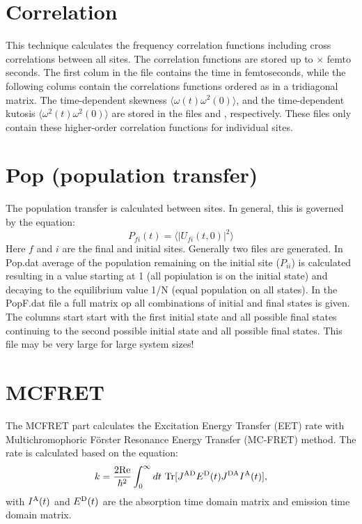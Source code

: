 \section{Correlation}
This technique calculates the frequency correlation functions including cross correlations between all sites. The correlation functions are stored up to $\times$ femto seconds. The first colum in the file  contains the time in femtoseconds, while the following colums contain the correlations functions ordered as in a tridiagonal matrix. The time-dependent skewness $\langle \omega(t)\omega^2(0) \rangle$, and the time-dependent kutosis $\langle \omega^2(t)\omega^2(0) \rangle$ are stored in the files  and , respectively. These files only contain these higher-order correlation functions for individual sites.
\section{Pop (population transfer)}
The population transfer is calculated between sites. In general, this is governed by the equation:
\begin{equation}
P_{fi}(t)=\langle |U_{fi}(t,0)|^2 \rangle
\end{equation}
Here $f$ and $i$ are the final and initial sites. Generally two files are generated. In Pop.dat average of the population remaining on the initial site ($P_{ii}$) is calculated resulting in a value starting at 1 (all popiulation is on the initial state) and decaying to the equilibrium value 1/N (equal population on all states). In the PopF.dat file a full matrix op all combinations of initial and final states is given. The columns start start with the first initial state and all possible final states continuing to the second possible initial state and all possible final states. This file may be very large for large system sizes!

\section{MCFRET}
The MCFRET part calculates the Excitation Energy Transfer (EET) rate with Multichromophoric Förster Resonance Energy Transfer (MC-FRET) method.\cite{Jang.2004.Phys.Rev.Lett..92.218301,Jang.2007.J.Phys.Chem.B..111.6807,Zhong.2023.J.Chem.Phys..158.064103} The rate is calculated based on the equation:
\begin{equation}\label{eq:17} 
    k=\frac{\rm 2Re}{\hbar^2}\int_{0}^{\infty}dt\ \textrm{Tr}[J^{\textrm {AD}}E^{\textrm D}(t)J^{\textrm {DA}}I^{\textrm A}(t)],
\end{equation}
with $I^{\textrm A}(t)$ and $E^{\textrm D}(t)$ are the absorption time domain matrix and emission time domain matrix. 

